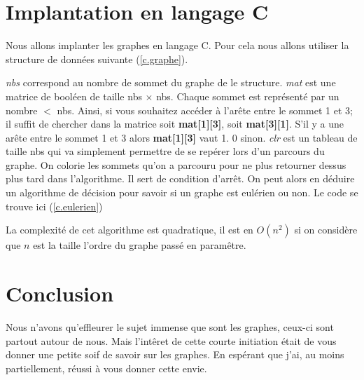 \documentclass[12pt,a4paper]{scrartcl}
\theoremstyle{plain}
\theoremstyle{remark}
\begin{document}
\section{Implantation en langage C}

Nous allons implanter les graphes en langage C. Pour cela nous allons utiliser la structure de données suivante (\ref{c.graphe}).


\label{c.graphe}
\textit{nbs} correspond au nombre de sommet du graphe de le structure. \textit{mat} est une matrice de booléen de taille  nbs $\times$ nbs. Chaque sommet est représenté par un nombre $<$ nbs. Ainsi, si vous souhaitez accéder à l'arête entre le sommet 1 et 3; il suffit de chercher dans la matrice soit \textbf{mat[1][3]}, soit \textbf{mat[3][1]}. S'il y a une arête entre le sommet 1 et 3 alors \textbf{mat[1][3]} vaut 1. 0 sinon. \textit{clr} est un tableau de taille nbs qui va simplement permettre de se repérer lors d'un parcours du graphe. On colorie les sommets qu'on a parcouru pour ne plus retourner dessus plus tard dans l'algorithme. Il sert de condition d'arrêt.
On peut alors en déduire un algorithme de décision pour savoir si un graphe est eulérien ou non. Le code se trouve ici (\ref{c.eulerien})

\label{c.eulerien}

La complexité de cet algorithme est quadratique, il est en $O(n^2)$ si on considère que $n$ est la taille l'ordre du graphe passé en paramêtre.

\section{Conclusion}

Nous n'avons qu'effleurer le sujet immense que sont les graphes, ceux-ci sont partout autour de nous. Mais l'intêret de cette courte initiation était de vous donner une petite soif de savoir sur les graphes. En espérant que j'ai, au moins partiellement, réussi à vous donner cette envie.


\end{document}
